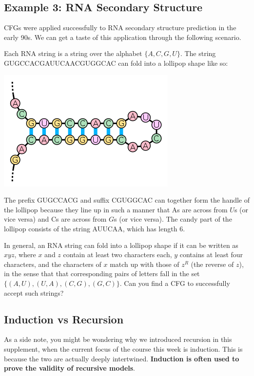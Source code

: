 \documentclass{article}
\begin{document}
\subsection*{Example 3: RNA Secondary Structure}
        CFGs were applied successfully to RNA secondary structure prediction in the early 90s. We can get a taste of this application through the following scenario. 
        
        \vspace{3mm}Each RNA string is a string over the alphabet $\{A, C, G, U\}$. The string GUGCCACGAUUCAACGUGGCAC can fold into a lollipop shape like so:
        \begin{center}
            \includegraphics[scale = 0.4]{images/stem-loop.png}
        \end{center}
        The prefix GUGCCACG and suffix CGUGGCAC can together form the handle of the lollipop because they line up in such a manner that As are across from $U$s (or vice versa) and Cs are across from $G$s (or vice versa). The candy part of the lollipop consists of the string AUUCAA, which has length 6.

        \vspace{3mm}In general, an RNA string can fold into a lollipop shape if it can be written as $xyz$, where $x$ and $z$ contain at least two characters each, $y$ contains at least four characters, and the characters of $x$ match up with those of $z^{R}$ (the reverse of $z$), in the sense that that corresponding pairs of letters fall in the set $\{(A, U), (U, A), (C, G), (G, C)\}$. Can you find a CFG to successfully accept such strings?

\subsection*{Induction vs Recursion}
    As a side note, you might be wondering why we introduced recursion in this supplement, when the current focus of the course this week is induction. This is because the two are actually deeply intertwined. \textbf{Induction is often used to prove the validity of recursive models}.
\end{document}
